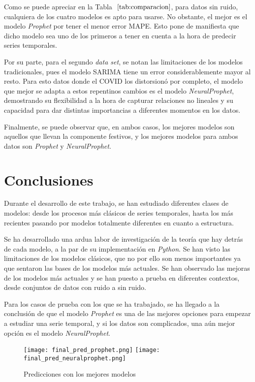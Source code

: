 \documentclass[12pt,twoside]{article}
\begin{document}
Como se puede apreciar en la Tabla $~\ref{tab:comparacion}$, para datos sin ruido, cualquiera de los cuatro modelos es apto para usarse. No obstante, el mejor es el modelo \textit{Prophet} por tener el menor error MAPE. Esto pone de manifiesta que dicho modelo sea uno de los primeros a tener en cuenta a la hora de predecir series temporales.

Por su parte, para el segundo \textit{data set}, se notan las limitaciones de los modelos tradicionales, pues el modelo SARIMA tiene un error considerablemente mayor al resto. Para esto datos donde el COVID los distorsionó por completo, el modelo que mejor se adapta a estos repentinos cambios es el modelo \textit{NeuralProphet}, demostrando su flexibilidad a la hora de capturar relaciones no lineales y su capacidad para dar distintas importancias a diferentes momentos en los datos.

Finalmente, se puede observar que, en ambos casos, los mejores modelos son aquellos que llevan la componente festivos, y los mejores modelos para ambos datos son \textit{Prophet} y \textit{NeuralProphet}.

\newpage

\section{Conclusiones}\label{sec:39}

Durante el desarrollo de este trabajo, se han estudiado diferentes clases de modelos: desde los procesos más clásicos de series temporales, hasta los más recientes pasando por modelos totalmente diferentes en cuanto a estructura.


Se ha desarrollado una ardua labor de investigación de la teoría que hay detrás de cada modelo, a la par de su implementación en \textit{Python}. Se han visto las limitaciones de los modelos clásicos, que no por ello son menos importantes ya que sentaron las bases de los modelos más actuales. Se han observado las mejoras de los modelos más actuales y se han puesto a prueba en diferentes contextos, desde conjuntos de datos con ruido a sin ruido.

Para los casos de prueba con los que se ha trabajado, se ha llegado a la conclusión de que el modelo \textit{Prophet} es una de las mejores opciones para empezar a estudiar una serie temporal, y si los datos son complicados, una aún mejor opción es el modelo \textit{NeuralProphet}. 


\begin{figure}[h]
    \centering
    \texttt{[image: final\_pred\_prophet.png]}
    \texttt{[image: final\_pred\_neuralprophet.png]}
    \caption{Predicciones con los mejores modelos} 
    \label{fig:fig30}
\end{figure}
\end{document}
